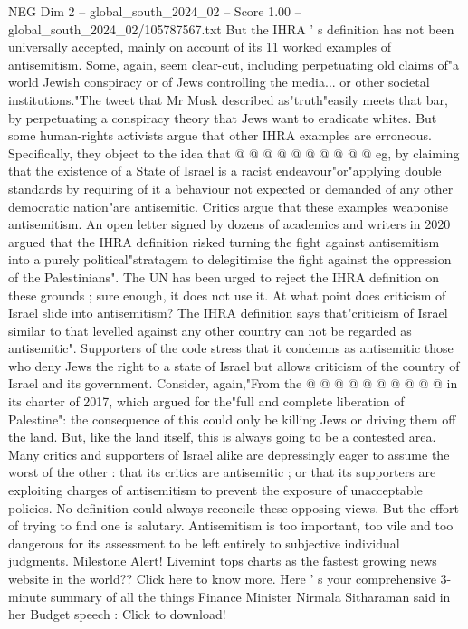 \begin{textsample}{NEG Dim 2 – global\_south\_2024\_02 – Score 1.00 – global\_south\_2024\_02/105787567.txt}
But the IHRA ' s definition has not been universally accepted, mainly on account of its 11 worked examples of antisemitism.
Some, again, seem clear-cut, including perpetuating old claims of"a world Jewish conspiracy or of Jews controlling the media... or other societal institutions."The tweet that Mr Musk described as"truth"easily meets that bar, by perpetuating a conspiracy theory that Jews want to eradicate whites.
But some human-rights activists argue that other IHRA examples are erroneous.
Specifically, they object to the idea that @ @ @ @ @ @ @ @ @ @ eg, by claiming that the existence of a State of Israel is a racist endeavour"or"applying double standards by requiring of it a behaviour not expected or demanded of any other democratic nation"are antisemitic.
Critics argue that these examples weaponise antisemitism.
An open letter signed by dozens of academics and writers in 2020 argued that the IHRA definition risked turning the fight against antisemitism into a purely political"stratagem to delegitimise the fight against the oppression of the Palestinians".
The UN has been urged to reject the IHRA definition on these grounds ; sure enough, it does not use it.
At what point does criticism of Israel slide into antisemitism?
The IHRA definition says that"criticism of Israel similar to that levelled against any other country can not be regarded as antisemitic".
Supporters of the code stress that it condemns as antisemitic those who deny Jews the right to a state of Israel but allows criticism of the country of Israel and its government.
Consider, again,"From the @ @ @ @ @ @ @ @ @ @ in its charter of 2017, which argued for the"full and complete liberation of Palestine": the consequence of this could only be killing Jews or driving them off the land.
But, like the land itself, this is always going to be a contested area.
Many critics and supporters of Israel alike are depressingly eager to assume the worst of the other : that its critics are antisemitic ; or that its supporters are exploiting charges of antisemitism to prevent the exposure of unacceptable policies.
No definition could always reconcile these opposing views.
But the effort of trying to find one is salutary.
Antisemitism is too important, too vile and too dangerous for its assessment to be left entirely to subjective individual judgments.
Milestone Alert!
Livemint tops charts as the fastest growing news website in the world??
Click here to know more.
Here ' s your comprehensive 3-minute summary of all the things Finance Minister Nirmala Sitharaman said in her Budget speech : Click to download!

\end{textsample}
